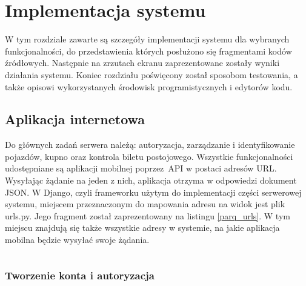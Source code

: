 \setcounter{listing}{0}

\section{Implementacja systemu}

W tym rozdziale zawarte są szczegóły implementacji systemu dla wybranych funkcjonalności, do przedstawienia których posłużono się fragmentami kodów źródłowych. Następnie na zrzutach ekranu zaprezentowane zostały wyniki działania systemu. Koniec rozdziału poświęcony został sposobom testowania, a także opisowi wykorzystanych środowisk programistycznych i edytorów kodu.

\subsection{Aplikacja internetowa}

Do głównych zadań serwera należą: autoryzacja, zarządzanie i identyfikowanie pojazdów, kupno oraz kontrola biletu postojowego. Wszystkie funkcjonalności udostępniane są aplikacji mobilnej poprzez API w postaci adresów URL. Wysyłając żądanie na jeden z nich, aplikacja otrzyma w odpowiedzi dokument JSON. W Django, czyli frameworku użytym do implementacji części serwerowej systemu, miejscem przeznaczonym do mapowania adresu na widok jest plik urls.py. Jego fragment został zaprezentowany na listingu \ref{parq_urls}. W tym miejscu znajdują się także wszystkie adresy w systemie, na jakie aplikacja mobilna będzie wysyłać swoje żądania.

\begin{singlespace}
	\label{parq_urls}
	\vspace{0.3cm}
	\inputminted[fontsize=\footnotesize, linenos=true]{python}{src/imp/urlpatterns.py}
\end{singlespace}

\subsubsection*{Tworzenie konta i autoryzacja}


